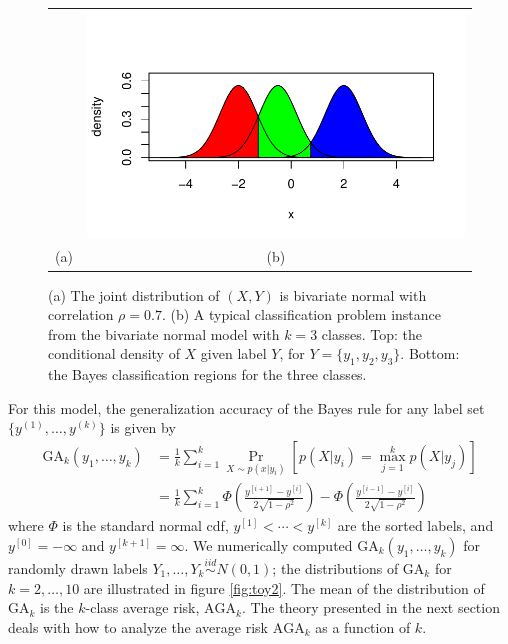 \documentclass[12pt]{article}
\begin{document}
\begin{figure}[h]
\begin{tabular}{cc}
 &  \includegraphics[scale = 0.5, clip = true, trim = 0 0 0 0.5in]{illus_example1b.pdf}\\
(a) & (b)
\end{tabular}

\caption{
(a) The joint distribution of $(X, Y)$ is bivariate normal with correlation $\rho = 0.7$.
(b) A typical classification problem instance from the bivariate normal model with $k = 3$ classes.
Top: the conditional density of $X$ given label $Y$, for $Y = \{y_1, y_2, y_3\}$.
Bottom: the Bayes classification regions for the three classes.}\label{fig:toy1}
\end{figure}

For this model, the generalization accuracy of the Bayes rule for any label set $\{y^{(1)},\hdots, y^{(k)}\}$ is given by
\begin{align*}
\text{GA}_k(y_1,\hdots, y_k) &= \frac{1}{k}\sum_{i=1}^k \Pr_{X \sim p(x|y_i)}[p(X|y_i) = \max_{j=1}^k p(X|y_j)]
\\&= \frac{1}{k}\sum_{i=1}^k \Phi\left(\frac{y^{[i+1]} - y^{[i]}}{2\sqrt{1-\rho^2}}\right) - \Phi\left(\frac{y^{[i-1]} - y^{[i]}}{2\sqrt{1-\rho^2}}\right)
\end{align*}
where $\Phi$ is the standard normal cdf, $y^{[1]} < \cdots < y^{[k]}$ are the sorted labels, and $y^{[0]} = -\infty$ and $y^{[k+1]} = \infty$.
We numerically computed $\text{GA}_k(y_1,\hdots, y_k)$ for randomly
drawn labels $Y_1,\hdots, Y_k \stackrel{iid}{\sim} N(0, 1)$; the
distributions of $\text{GA}_k$ for $k = 2,\hdots, 10$
are illustrated in figure \ref{fig:toy2}.  The mean of the distribution of $\text{GA}_k$ is the $k$-class average risk,
$\text{AGA}_k$. The theory
presented in the next section deals with how to analyze the
average risk $\text{AGA}_k$ as a function of $k$. 
\end{document}
